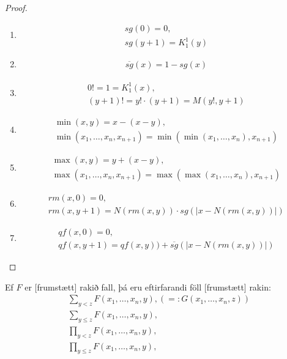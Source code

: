 \documentclass[12pt]{book}
\newcommand{\xxn}{x_1, \dotsc, x_n}
\begin{document}
\begin{proof}
\begin{enumerate}[(1)]
  \item 
    \begin{gather*}
    sg(0) = 0,\\
    sg(y+1) = K^1_1(y)
    \end{gather*}
  \item 
    \begin{gather*}
    \overline{sg}(x) = 1 - sg(x)
    \end{gather*}
  \item
    \begin{gather*}
      0! = 1 = K^1_1(x),\\
      (y+1)! = y! \cdot (y+1) = M(y!,y+1)
    \end{gather*}
  \item 
    \begin{gather*}
      \min(x,y) = x - (x-y), \\
      \min(\xxn, x_{n+1}) = \min( \min( \xxn), x_{n+1})
    \end{gather*}
  \item 
    \begin{gather*}
      \max(x,y) = y + (x-y), \\
      \max(\xxn, x_{n+1}) = \max( \max( \xxn), x_{n+1})
    \end{gather*}
  \item 
    \begin{gather*}
    rm(x,0) = 0,\\
    rm(x,y+1) = N(rm(x,y)) \cdot sg(|x-N(rm(x,y))|)
    \end{gather*}
  \item 
    \begin{gather*}
    qf(x,0) = 0,\\
    qf(x,y+1) = qf(x,y)) + \overline{sg}(|x-N(rm(x,y))|)
    \end{gather*}
  \end{enumerate}
\end{proof}

\begin{setn}
  Ef $F$ er [frumstætt] rakið fall, þá eru eftirfarandi föll [frumstætt] rakin:
  \begin{gather*}
    \sum_{y < z} F(\xxn,y), ( =: G(\xxn,z)) \\
    \sum_{y \leq z} F(\xxn,y),  \\
    \prod_{y < z} F(\xxn,y),  \\
    \prod_{y \leq z} F(\xxn,y),  \\
  \end{gather*}
\end{setn}
\end{document}
